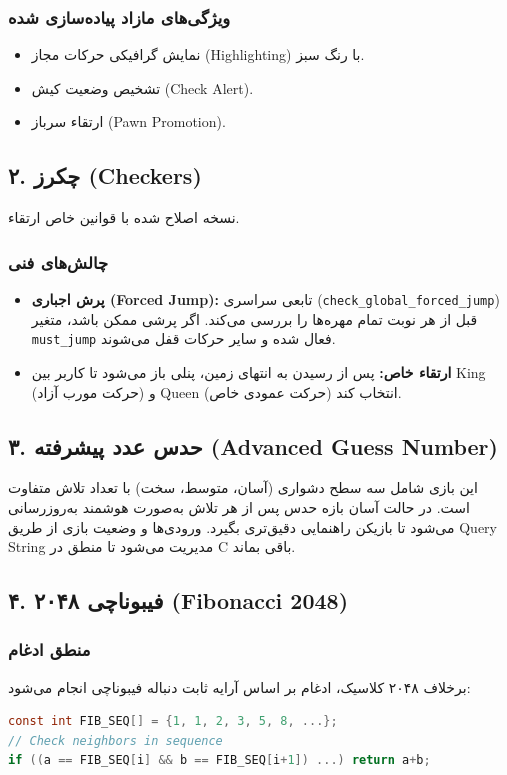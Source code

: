 \documentclass[12pt, a4paper]{article}
\begin{document}
\subsubsection{ویژگی‌های مازاد پیاده‌سازی شده}
\begin{itemize}
    \item نمایش گرافیکی حرکات مجاز (Highlighting) با رنگ سبز.
    \item تشخیص وضعیت کیش (Check Alert).
    \item ارتقاء سرباز (Pawn Promotion).
\end{itemize}

\subsection{۲. چکرز (Checkers)}
نسخه اصلاح شده با قوانین خاص ارتقاء.
\subsubsection{چالش‌های فنی}
\begin{itemize}
    \item \textbf{پرش اجباری (Forced Jump):} تابعی سراسری (\texttt{check\_global\_forced\_jump}) قبل از هر نوبت تمام مهره‌ها را بررسی می‌کند. اگر پرشی ممکن باشد، متغیر \texttt{must\_jump} فعال شده و سایر حرکات قفل می‌شوند.
    \item \textbf{ارتقاء خاص:} پس از رسیدن به انتهای زمین، پنلی باز می‌شود تا کاربر بین King (حرکت مورب آزاد) و Queen (حرکت عمودی خاص) انتخاب کند.
\end{itemize}

\subsection{۳. حدس عدد پیشرفته (Advanced Guess Number)}
این بازی شامل سه سطح دشواری (آسان، متوسط، سخت) با تعداد تلاش متفاوت است. در حالت آسان بازه حدس پس از هر تلاش به‌صورت هوشمند به‌روزرسانی می‌شود تا بازیکن راهنمایی دقیق‌تری بگیرد. ورودی‌ها و وضعیت بازی از طریق Query String مدیریت می‌شود تا منطق در C باقی بماند.

\subsection{۴. فیبوناچی ۲۰۴۸ (Fibonacci 2048)}
\subsubsection{منطق ادغام}
برخلاف ۲۰۴۸ کلاسیک، ادغام بر اساس آرایه ثابت دنباله فیبوناچی انجام می‌شود:
\begin{latin}
\begin{lstlisting}[language=C]
const int FIB_SEQ[] = {1, 1, 2, 3, 5, 8, ...};
// Check neighbors in sequence
if ((a == FIB_SEQ[i] && b == FIB_SEQ[i+1]) ...) return a+b;
\end{lstlisting}
\end{latin}
\end{document}
